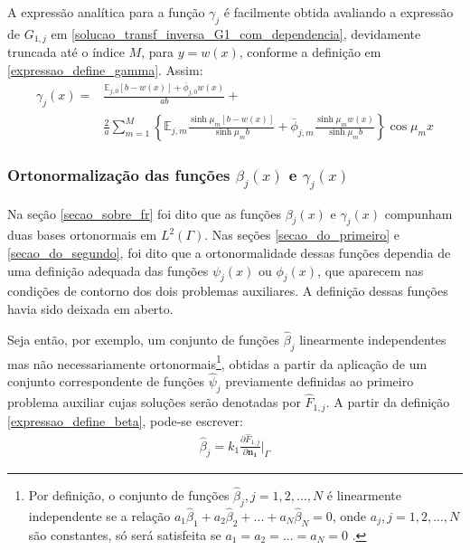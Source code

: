 A expressão analítica para a função $\gamma_j$ é facilmente obtida avaliando a expressão de $G_{1,j}$ em \eqref{solucao_transf_inversa_G1_com_dependencia}, devidamente truncada até o índice $M$, para $y = w(x)$, conforme a definição em \eqref{expressao_define_gamma}. Assim:
\begin{align}
\gamma_j(x) = & \frac{\mathbb{E}_{j,0}[b - w(x)] + \bar{\phi}_{j,0}w(x)}{ab} + \nonumber \\
&\frac{2}{a}\sum_{m=1}^M \left\lbrace\mathbb{E}_{j,m}\frac{\sinh\mu_m [b - w(x)]}{\sinh\mu_m b} + \bar{\phi}_{j, m}\frac{\sinh\mu_m w(x)}{\sinh\mu_m b}\right\rbrace \cos\mu_m x
\label{serie_para_gamma}
\end{align} 

\subsubsection{Ortonormalização das funções $\beta_j(x)$ e $\gamma_j(x)$}\label{orto_beta_gama}

Na seção \ref{secao_sobre_fr} foi dito que as funções $\beta_j(x)$ e $\gamma_j(x)$ compunham duas bases ortonormais em $L^2(\Gamma)$.
Nas seções \ref{secao_do_primeiro} e \ref{secao_do_segundo}, foi dito que a ortonormalidade dessas funções dependia de uma definição adequada das funções $\psi_j(x)$
ou $\phi_j(x)$, que aparecem nas condições de contorno dos dois problemas auxiliares. A definição dessas funções havia sido deixada em aberto.

Seja então, por exemplo, um conjunto de funções $\hat{\beta}_j$ linearmente independentes mas não necessariamente ortonormais\footnote{Por definição, o conjunto de funções $\hat{\beta}_j, j = 1,2,...,N$ é linearmente independente se a relação $a_1\hat{\beta}_1 + a_2\hat{\beta}_2 + ... + a_N\hat{\beta}_N = 0$, onde $a_j, j=1,2,...,N$ são constantes, só será satisfeita se $a_1 = a_2 = ... = a_N = 0$ \citep{livro_axler}.}, obtidas a partir da aplicação de um conjunto correspondente de funções $\hat{\psi}_j$ previamente definidas ao primeiro problema auxiliar cujas soluções serão denotadas por $\hat{F}_{1,j}$. A partir da definição \eqref{expressao_define_beta}, pode-se escrever:
\begin{align}
\hat{\beta}_j = k_1 \frac{\partial \hat{F}_{1,j}}{\partial\mathbf{n_1}}\bigg|_\Gamma
\end{align}

